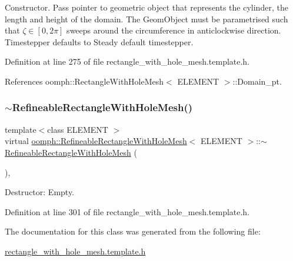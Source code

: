 Constructor. Pass pointer to geometric object that represents the cylinder, the length and height of the domain. The Geom\+Object must be parametrised such that $\zeta \in [0,2\pi]$ sweeps around the circumference in anticlockwise direction. Timestepper defaults to Steady default timestepper. 



Definition at line 275 of file rectangle\+\_\+with\+\_\+hole\+\_\+mesh.\+template.\+h.



References oomph\+::\+Rectangle\+With\+Hole\+Mesh$<$ E\+L\+E\+M\+E\+N\+T $>$\+::\+Domain\+\_\+pt.

\mbox{\label{classoomph_1_1RefineableRectangleWithHoleMesh_a1a04b6a5da21108a50934c4909625cf1}} 
\subsubsection{\texorpdfstring{$\sim$\+Refineable\+Rectangle\+With\+Hole\+Mesh()}{~RefineableRectangleWithHoleMesh()}}
{\footnotesize\ttfamily template$<$class E\+L\+E\+M\+E\+NT $>$ \\
virtual \hyperlink{classoomph_1_1RefineableRectangleWithHoleMesh}{oomph\+::\+Refineable\+Rectangle\+With\+Hole\+Mesh}$<$ E\+L\+E\+M\+E\+NT $>$\+::$\sim$\hyperlink{classoomph_1_1RefineableRectangleWithHoleMesh}{Refineable\+Rectangle\+With\+Hole\+Mesh} (\begin{DoxyParamCaption}{ }\end{DoxyParamCaption})\hspace{0.3cm}{\ttfamily [inline]}, {\ttfamily [virtual]}}



Destructor\+: Empty. 



Definition at line 301 of file rectangle\+\_\+with\+\_\+hole\+\_\+mesh.\+template.\+h.



The documentation for this class was generated from the following file\+:\begin{DoxyCompactItemize}
\item 
\hyperlink{rectangle__with__hole__mesh_8template_8h}{rectangle\+\_\+with\+\_\+hole\+\_\+mesh.\+template.\+h}\end{DoxyCompactItemize}
